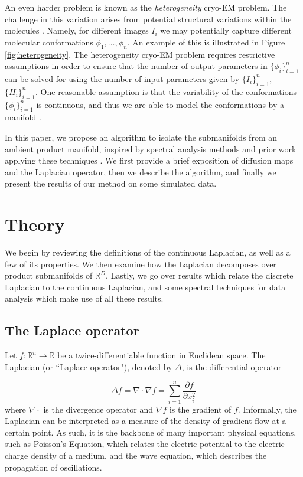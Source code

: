 \documentclass{article}
\numberwithin{equation}{section}
\theoremstyle{definition}
\begin{document}
An even harder problem is known as the \textit{heterogeneity} cryo-EM problem. The challenge in this variation arises from potential structural variations within the molecules \cite{singer2018mathematics, MoscovichHaleviAndenSinger2020}. Namely, for different images $I_i$ we may potentially capture different molecular conformations $\phi_1, \ldots, \phi_n$. An example of this is illustrated in Figure \ref{fig:heterogeneity}. The heterogeneity cryo-EM problem requires restrictive assumptions in order to ensure that the number of output parameters in $\{\phi_i\}_{i=1}^n$ can be solved for using the number of input parameters given by $\{I_i\}_{i=1}^n$, $\{H_i\}_{i=1}^n$. One reasonable assumption is that the variability of the conformations $\{\phi_i\}_{i=1}^n$ is continuous, and thus we are able to model the conformations by a manifold \cite{MoscovichHaleviAndenSinger2020}.

In this paper, we propose an algorithm to isolate the submanifolds from an ambient product manifold, inspired by spectral analysis methods \cite{coifman2006diffusion, 10.5555/2980539.2980616, Belkin_2003} and prior work applying these techniques \cite{Singer_2006, zelesko2019earthmover}. We first provide a brief exposition of diffusion maps and the Laplacian operator, then we describe the algorithm, and finally we present the results of our method on some simulated data.

\section{Theory}
We begin by reviewing the definitions of the continuous Laplacian, as well as a few of its properties. We then examine how the Laplacian decomposes over product submanifolds of $\mathbb{R}^D$. Lastly, we go over results which relate the discrete Laplacian to the continuous Laplacian, and some spectral techniques for data analysis which make use of all these results.

\subsection{The Laplace operator}
Let $f : \mathbb{R}^n \rightarrow \mathbb{R}$ be a twice-differentiable function in Euclidean space. The Laplacian (or ``Laplace operator"), denoted by $\Delta$, is the differential operator

\begin{equation}\label{laplace}
    \Delta f = \nabla \cdot \nabla f = \sum_{i=1}^n \frac{\partial f}{\partial x^2_i}
\end{equation}
where $\nabla \cdot$ is the divergence operator and $\nabla f$ is the gradient of $f$. Informally, the Laplacian can be interpreted as a measure of the density of gradient flow at a certain point. As such, it is the backbone of many important physical equations, such as Poisson's Equation, which relates the electric potential to the electric charge density of a medium, and the wave equation, which describes the propagation of oscillations.
\end{document}
